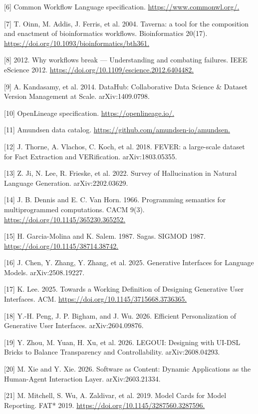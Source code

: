 \documentclass[11pt,a4paper]{article}
\begin{document}
[6] Common Workflow Language specification. \url{https://www.commonwl.org/.}

[7] T. Oinn, M. Addis, J. Ferris, et al. 2004. Taverna: a tool for the composition and enactment of bioinformatics workflows. Bioinformatics 20(17). \url{https://doi.org/10.1093/bioinformatics/bth361.}

[8] 2012. Why workflows break --- Understanding and combating failures. IEEE eScience 2012. \url{https://doi.org/10.1109/escience.2012.6404482.}

[9] A. Kandasamy, et al. 2014. DataHub: Collaborative Data Science \& Dataset Version Management at Scale. arXiv:1409.0798.

[10] OpenLineage specification. \url{https://openlineage.io/.}

[11] Amundsen data catalog. \url{https://github.com/amundsen-io/amundsen.}

[12] J. Thorne, A. Vlachos, C. Koch, et al. 2018. FEVER: a large-scale dataset for Fact Extraction and VERification. arXiv:1803.05355.

[13] Z. Ji, N. Lee, R. Frieske, et al. 2022. Survey of Hallucination in Natural Language Generation. arXiv:2202.03629.

[14] J. B. Dennis and E. C. Van Horn. 1966. Programming semantics for multiprogrammed computations. CACM 9(3). \url{https://doi.org/10.1145/365230.365252.}

[15] H. Garcia-Molina and K. Salem. 1987. Sagas. SIGMOD 1987. \url{https://doi.org/10.1145/38714.38742.}

[16] J. Chen, Y. Zhang, Y. Zhang, et al. 2025. Generative Interfaces for Language Models. arXiv:2508.19227.

[17] K. Lee. 2025. Towards a Working Definition of Designing Generative User Interfaces. ACM. \url{https://doi.org/10.1145/3715668.3736365.}

[18] Y.-H. Peng, J. P. Bigham, and J. Wu. 2026. Efficient Personalization of Generative User Interfaces. arXiv:2604.09876.

[19] Y. Zhou, M. Yuan, H. Xu, et al. 2026. LEGOUI: Designing with UI-DSL Bricks to Balance Transparency and Controllability. arXiv:2608.04293.

[20] M. Xie and Y. Xie. 2026. Software as Content: Dynamic Applications as the Human-Agent Interaction Layer. arXiv:2603.21334.

[21] M. Mitchell, S. Wu, A. Zaldivar, et al. 2019. Model Cards for Model Reporting. FAT* 2019. \url{https://doi.org/10.1145/3287560.3287596.}
\end{document}
